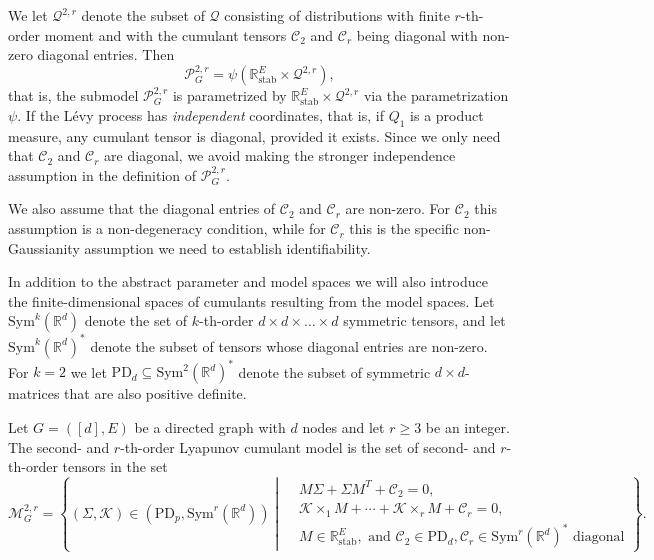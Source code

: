 \documentclass{biometrika}
\begin{document}
We let $\mathcal{Q}^{2, r}$ denote the subset of $\mathcal{Q}$ consisting of distributions with 
finite $r$-th-order moment and with the cumulant tensors $\mathcal{C}_2$ and $\mathcal{C}_r$ 
being diagonal with non-zero diagonal entries. Then  
$$
    \mathcal{P}^{2, r}_{G} = \psi(\mathbb{R}^{E}_{\mathrm{stab}} \times \mathcal{Q}^{2, r}),
$$
that is, the submodel $\mathcal{P}^{2, r}_{G}$ is parametrized by 
$\mathbb{R}^{E}_{\mathrm{stab}} \times \mathcal{Q}^{2, r}$ via the parametrization $\psi$.
If the Lévy process has \emph{independent} coordinates, that is, if $Q_1$ is a product measure, 
any cumulant tensor is diagonal, provided it exists. Since we only need that $\mathcal{C}_2$ and $\mathcal{C}_r$ are diagonal, we avoid making the stronger independence assumption in the 
definition of $\mathcal{P}^{2, r}_{G}$. 

We also assume that the diagonal entries of 
$\mathcal{C}_2$ and $\mathcal{C}_r$ are non-zero. For $\mathcal{C}_2$ this assumption is a 
non-degeneracy condition, while for $\mathcal{C}_r$ this is the specific non-Gaussianity assumption 
we need to establish identifiability. 

In addition to the abstract parameter and model spaces we will also introduce the
finite-dimensional spaces of cumulants resulting from the model spaces. Let 
$\mathrm{Sym}^k(\mathbb{R}^d)$ denote the set of $k$-th-order 
$d \times d \times \ldots \times d$ symmetric tensors, and let $\mathrm{Sym}^k(\mathbb{R}^d)^*$ 
denote the subset of tensors whose diagonal entries are non-zero. For 
$k = 2$ we let $\mathrm{PD}_d \subseteq \mathrm{Sym}^2(\mathbb{R}^d)^*$ 
denote the subset of symmetric $d \times d$-matrices that are also positive definite.

\begin{definition}
\label{dfn:cumulantmodel}
Let $G = ([d], E)$ be a directed graph with $d$ nodes and let $r \geq 3$ be an integer. 
The second- and $r$-th-order Lyapunov cumulant model is the set of second- and $r$-th-order tensors in the set 
{\small
\begin{equation*}
\mathcal{M}^{2, r}_G = 
 \left\{ 
(\Sigma, \mathcal{K} ) \in (\mathrm{PD}_p, \mathrm{Sym}^r(\mathbb{R}^d)) \; \left\vert \; \begin{aligned}
    &M \Sigma + \Sigma M^T + \mathcal{C}_2 = 0, \\ 
    &\mathcal{K}  \times_1 M +  \cdots+ \mathcal{K}  \times_r M + \mathcal{C}_r = 0, \\ 
    &M \in \mathbb{R}^{E}_{\mathrm{stab}}, \text{ and } \mathcal{C}_2 \in \mathrm{PD}_{d}, 
    \mathcal{C}_r \in \mathrm{Sym}^r(\mathbb{R}^d)^* \text{ diagonal}
\end{aligned}\right.
\right\}.
\end{equation*}
}
\end{definition}
\end{document}
